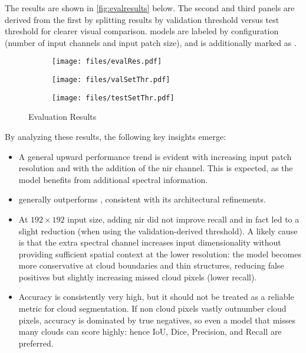 {\clearpage
The results are shown in \autoref{fig:evalresults} below.
The second and third panels are derived from the first by splitting results by validation threshold versus test threshold for clearer visual comparison.
 models are labeled by configuration (number of input channels and input patch size), and  is additionally marked as .

\begin{figure}[H]
  \centering
  
  \begin{subfigure}[t]{\textwidth}
    \centering
    \texttt{[image: files/evalRes.pdf]}
  \end{subfigure}

  \begin{subfigure}[t]{0.5\textwidth}
    \centering
    \texttt{[image: files/valSetThr.pdf]}
  \end{subfigure}%
  \begin{subfigure}[t]{0.5\textwidth}
    \centering
    \texttt{[image: files/testSetThr.pdf]}
  \end{subfigure}

  \caption{Evaluation Results}
  \label{fig:evalresults}
\end{figure}


By analyzing these results, the following key insights emerge:
\begin{itemize}
    \item A general upward performance trend is evident with increasing input patch resolution and with the addition of the \gls{nir} channel.
    This is expected, as the model benefits from additional spectral information.
    \item {} generally outperforms , consistent with its architectural refinements.
    \item At \ensuremath{192\times192} input size, adding \gls{nir} did not improve recall and in fact led to a slight reduction (when using the validation-derived threshold).
    A likely cause is that the extra spectral channel increases input dimensionality without providing sufficient spatial context at the lower resolution:
    the model becomes more conservative at cloud boundaries and thin structures, reducing false positives but slightly increasing missed cloud pixels (lower recall).
    \item Accuracy is consistently very high, but it should not be treated as a reliable metric for cloud segmentation.
    If non cloud pixels vastly outnumber cloud pixels,
    accuracy is dominated by true negatives, so even a model that misses many clouds can score highly: hence IoU, Dice, Precision, and Recall are preferred.
\end{itemize}

}
